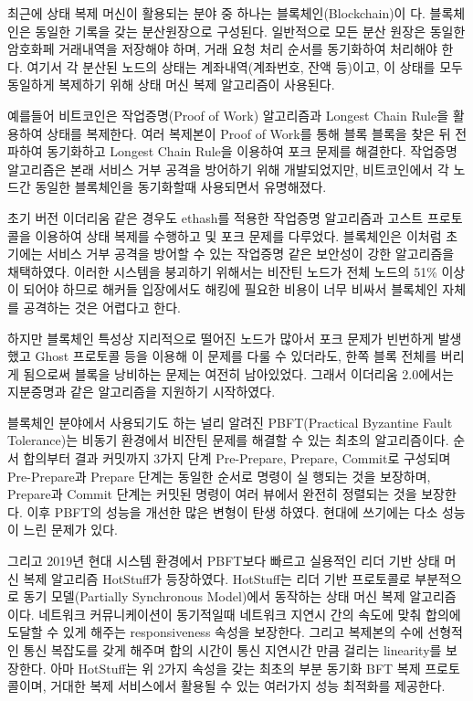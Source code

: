 \documentclass[table,smallextended]{svjour3}       %
\begin{document}
최근에 상태 복제 머신이 활용되는 분야 중 하나는 블록체인(Blockchain)이
다. 블록체인은 동일한 기록을 갖는 분산원장으로 구성된다. 일반적으로 모든
분산 원장은 동일한 암호화페 거래내역을 저장해야 하며, 거래 요청 처리 순서를
동기화하여 처리해야 한다. 여기서 각 분산된 노드의 상태는 계좌내역(계좌번호,
잔액 등)이고, 이 상태를 모두 동일하게 복제하기 위해 상태 머신 복제 알고리즘이
사용된다.

예를들어 비트코인\cite{nakamoto2019bitcoin}은 작업증명(Proof of Work) 알고리즘과 Longest Chain
Rule을 활용하여 상태를 복제한다. 여러 복제본이 Proof of Work를 통해 블록 블록을
찾은 뒤 전파하여 동기화하고 Longest Chain Rule을 이용하여 포크 문제를 해결한다.
작업증명 알고리즘은 본래 서비스 거부 공격을 방어하기 위해 개발되었지만, 
비트코인에서 각 노드간 동일한 블록체인을 동기화할때 사용되면서 유명해졌다.

초기 버전 이더리움\cite{buterin2013ethereum} 같은 경우도 ethash를 적용한 작업증명 알고리즘과 고스트 프로토콜을
이용하여 상태 복제를 수행하고 및 포크 문제를 다루었다. 블록체인은 이처럼 초기에는 
서비스 거부 공격을 방어할 수 있는 작업증명 같은 보안성이 강한 알고리즘을 채택하였다.
이러한 시스템을 붕괴하기 위해서는 비잔틴 노드가 전체 노드의 51\% 이상이 되어야 하므로
해커들 입장에서도 해킹에 필요한 비용이 너무 비싸서 블록체인 자체를 공격하는 것은
어렵다고 한다.

하지만 블록체인 특성상 지리적으로 떨어진 노드가 많아서 포크 문제가 빈번하게 발생했고
Ghost 프로토콜 등을 이용해 이 문제를 다룰 수 있더라도, 한쪽 블록 전체를 버리게 됨으로써 
블록을 낭비하는 문제는 여전히 남아있었다. 그래서 이더리움 2.0에서는 지분증명과
같은 알고리즘을 지원하기 시작하였다.

블록체인 분야에서 사용되기도 하는 널리 알려진 PBFT(Practical Byzantine Fault Tolerance)는 
비동기 환경에서 비잔틴 문제를 해결할 수 있는
최초의 알고리즘이다. 순서 합의부터 결과 커밋까지 3가지 단계 Pre-Prepare, Prepare,
Commit로 구성되며 Pre-Prepare과 Prepare 단계는 동일한 순서로 명령이 실
행되는 것을 보장하며, Prepare과 Commit 단계는 커밋된 명령이 여러 뷰에서
완전히 정렬되는 것을 보장한다. 이후 PBFT의 성능을 개선한 많은 변형이 탄생
하였다. 현대에 쓰기에는 다소 성능이 느린 문제가 있다.

그리고 2019년 현대 시스템 환경에서 PBFT보다 빠르고 실용적인 리더 기반
상태 머신 복제 알고리즘 HotStuff\cite{yin2019hotstuff}가 등장하였다. 
HotStuff는 리더 기반 프로토콜로 부분적으로 동기 모델(Partially Synchronous Model)에서 동작하는 상태
머신 복제 알고리즘이다. 네트워크 커뮤니케이션이 동기적일때 네트워크 지연시
간의 속도에 맞춰 합의에 도달할 수 있게 해주는 responsiveness 속성을 보장한다.
그리고 복제본의 수에 선형적인 통신 복잡도를 갖게 해주며 합의 시간이 통신 지연시간 만큼 걸리는
linearity를 보장한다. 아마 HotStuff는 위 2가지 속성을 갖는 최초의 부분 동기화 BFT 복제 프로토콜이며,
거대한 복제 서비스에서 활용될 수 있는 여러가지 성능 최적화를 제공한다.
\end{document}
